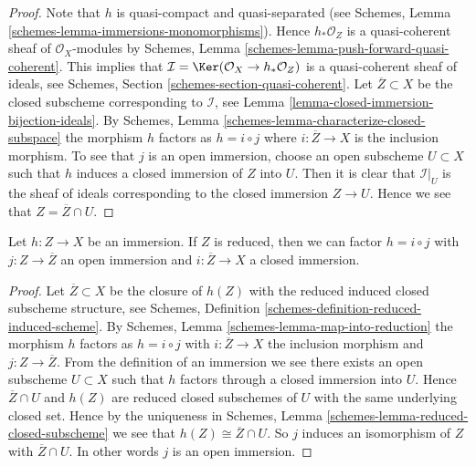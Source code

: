 \begin{proof}
Note that $h$ is quasi-compact and quasi-separated (see
Schemes, Lemma \ref{schemes-lemma-immersions-monomorphisms}).
Hence $h_*\mathcal{O}_Z$ is a quasi-coherent sheaf of $\mathcal{O}_X$-modules
by Schemes, Lemma \ref{schemes-lemma-push-forward-quasi-coherent}.
This implies that
$\mathcal{I} = \Ker(\mathcal{O}_X \to h_*\mathcal{O}_Z)$
is a quasi-coherent sheaf of ideals, see
Schemes, Section \ref{schemes-section-quasi-coherent}.
Let $\overline{Z} \subset X$ be the closed subscheme corresponding
to $\mathcal{I}$, see Lemma \ref{lemma-closed-immersion-bijection-ideals}.
By Schemes, Lemma \ref{schemes-lemma-characterize-closed-subspace}
the morphism $h$ factors as
$h = i \circ j$ where $i : \overline{Z} \to X$ is the inclusion morphism.
To see that $j$ is an open immersion, choose an open subscheme
$U \subset X$ such that $h$ induces a closed immersion of $Z$
into $U$. Then it is clear that $\mathcal{I}|_U$ is the
sheaf of ideals corresponding to the closed immersion $Z \to U$.
Hence we see that $Z = \overline{Z} \cap U$.
\end{proof}

\begin{lemma}
\label{lemma-factor-reduced-immersion}
Let $h : Z \to X$ be an immersion.
If $Z$ is reduced, then we can factor
$h = i \circ j$ with $j : Z \to \overline{Z}$ an
open immersion and $i : \overline{Z} \to X$ a closed immersion.
\end{lemma}

\begin{proof}
Let $\overline{Z} \subset X$ be the closure of $h(Z)$ with the reduced
induced closed subscheme structure, see
Schemes, Definition \ref{schemes-definition-reduced-induced-scheme}.
By Schemes, Lemma \ref{schemes-lemma-map-into-reduction}
the morphism $h$ factors as
$h = i \circ j$ with $i : \overline{Z} \to X$ the inclusion morphism
and $j : Z \to \overline{Z}$. From the definition of an immersion we
see there exists an open subscheme $U \subset X$ such that
$h$ factors through a closed immersion into $U$. Hence
$\overline{Z} \cap U$ and $h(Z)$ are reduced closed subschemes
of $U$ with the same underlying closed set. Hence by the uniqueness
in Schemes, Lemma \ref{schemes-lemma-reduced-closed-subscheme}
we see that $h(Z) \cong \overline{Z} \cap U$.
So $j$ induces an isomorphism of $Z$ with $\overline{Z} \cap U$.
In other words $j$ is an open immersion.
\end{proof}



